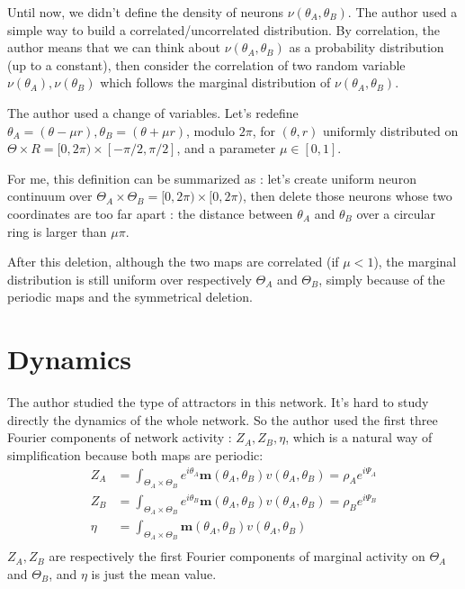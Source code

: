 \documentclass{article}
\begin{document}
	Until now, we didn't define the density of neurons $\nu(\theta_A,\theta_B)$. The author used a simple way to build a correlated/uncorrelated distribution. By correlation, the author means that we can think about $\nu(\theta_A,\theta_B)$ as a probability distribution (up to a constant), then consider the correlation of two random variable $\nu(\theta_A),\nu(\theta_B)$ which follows the marginal distribution of $\nu(\theta_A,\theta_B)$.
	
	The author used a change of variables. Let's redefine $\theta_A=(\theta-\mu r), \theta_B=(\theta+\mu r)$, modulo $2\pi$, for $(\theta,r)$ uniformly distributed on $\Theta\times R = [0,2\pi)\times[-\pi/2,\pi/2]$, and a parameter $\mu\in[0,1]$.
	
	For me, this definition can be summarized as : let's create uniform neuron continuum over $\Theta_A\times\Theta_B=[0,2\pi)\times[0,2\pi)$, then delete those neurons whose two coordinates are too far apart : the distance between $\theta_A$ and $\theta_B$ over a circular ring is larger than $\mu\pi$.
	
	After this deletion, although the two maps are correlated (if $\mu<1$), the marginal distribution is still uniform over respectively $\Theta_A$ and $\Theta_B$, simply because of the periodic maps and the symmetrical deletion.
	
	\section{Dynamics}
	The author studied the type of attractors in this network. It's hard to study directly the dynamics of the whole network. So the author used the first three Fourier components of network activity : $Z_A,Z_B,\eta$, which is a natural way of simplification because both maps are periodic:
	\begin{equation}
	\begin{split}
	Z_A &= \int_{\Theta_A\times\Theta_B} e^{i\theta_A} \mathbf{m}(\theta_A,\theta_B) v(\theta_A,\theta_B)=\rho_A e^{i\Psi_A}\\
	Z_B &= \int_{\Theta_A\times\Theta_B} e^{i\theta_B} \mathbf{m}(\theta_A,\theta_B) v(\theta_A,\theta_B)=\rho_B e^{i\Psi_B}\\
	\eta &= \int_{\Theta_A\times\Theta_B} \mathbf{m}(\theta_A,\theta_B) v(\theta_A,\theta_B)\\
	\end{split}
	\end{equation}
	$Z_A, Z_B$ are respectively the first Fourier components of marginal activity on $\Theta_A$ and $\Theta_B$, and $\eta$ is just the mean value.
	
\end{document}
